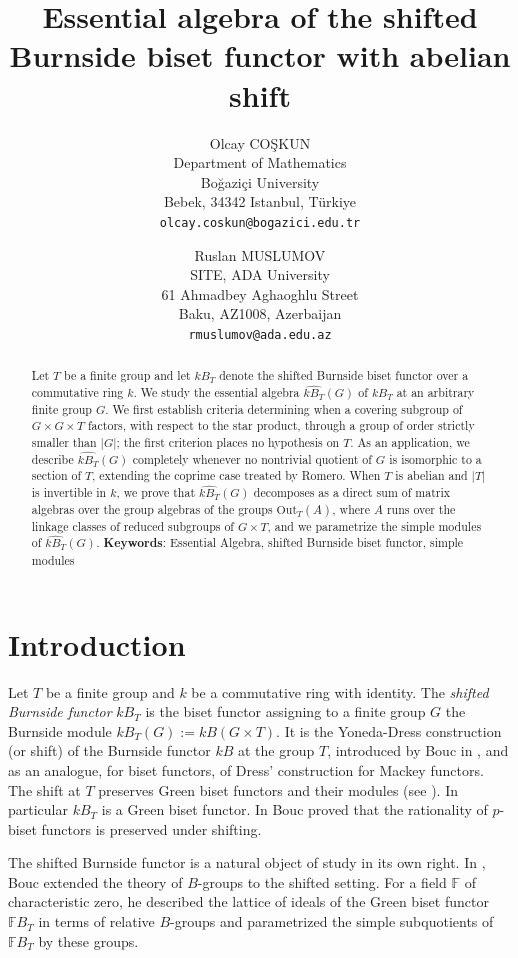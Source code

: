 \documentclass[12pt]{article}
\title{Essential algebra of the shifted Burnside biset functor with abelian shift}
\author{
  Olcay CO\c{S}KUN\\
  \small Department of Mathematics\\
  \small Bo\u{g}azi\c{c}i University\\
  \small Bebek, 34342 Istanbul, T\"urkiye\\
  \small \texttt{olcay.coskun@bogazici.edu.tr}
  \and
  Ruslan MUSLUMOV\\
  \small SITE, ADA University\\
  \small 61 Ahmadbey Aghaoghlu Street\\
  \small Baku, AZ1008, Azerbaijan\\
  \small \texttt{rmuslumov@ada.edu.az}
}
\date{}
\theoremstyle{change}
\newcommand{\Out}{\mathrm{Out}}
\newcommand{\1}{{\bf 1}}
\begin{document}
\maketitle
\begin{abstract}
Let $T$ be a finite group and let $kB_T$ denote the shifted Burnside biset functor over a commutative ring $k$. We study the essential algebra $\widehat{kB_T}(G)$ of $kB_T$ at an arbitrary finite group $G$. We first establish criteria determining when a covering subgroup of $G\times G\times T$ factors, with respect to the star product, through a group of order strictly smaller than $|G|$; the first criterion places no hypothesis on $T$. As an application, we describe $\widehat{kB_T}(G)$ completely whenever no nontrivial quotient of $G$ is isomorphic to a section of $T$, extending the coprime case treated by Romero. When $T$ is abelian and $|T|$ is invertible in $k$, we prove that $\widehat{kB_T}(G)$ decomposes as a direct sum of matrix algebras over the group algebras of the groups $\Out_T(A)$, where $A$ runs over the linkage classes of reduced subgroups of $G\times T$, and we parametrize the simple modules of $\widehat{kB_T}(G)$.
\noindent \textbf{Keywords}:  Essential Algebra, shifted Burnside biset functor, simple modules
\end{abstract}



\section{Introduction}
Let $T$ be a finite group and $k$ be a commutative ring with identity. The \emph{shifted Burnside functor} $kB_T$ is the biset functor assigning to a finite group $G$ the Burnside module $kB_T(G):= kB(G\times T)$. It is the Yoneda-Dress construction (or shift) of the Burnside functor $kB$ at the group $T$, introduced by Bouc in \cite{B2008}, and \cite[Section 8.2]{B} as an analogue, for biset functors, of Dress' construction for Mackey functors. The shift at $T$ preserves Green biset functors and their modules (see \cite[Lemma 4.4]{R2}). In particular $kB_T$ is a Green biset functor. In \cite{B2008} Bouc proved that the rationality of $p$-biset functors is preserved under shifting. 

The shifted Burnside functor is a natural object of study in its own right. In \cite{B3}, Bouc extended the theory of $B$-groups to the shifted setting. For a field $\mathbb F$ of characteristic zero, he described the lattice of ideals of the Green biset functor $\mathbb F B_T$ in terms of relative $B$-groups and parametrized the simple subquotients of $\mathbb FB_T$ by these groups.
\end{document}
